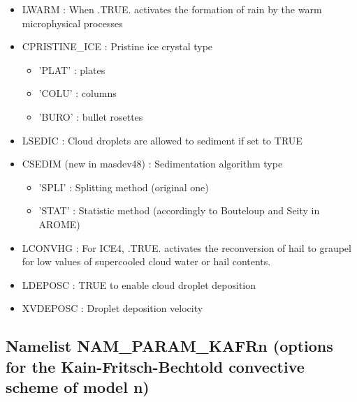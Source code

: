 \begin{itemize}
\item
LWARM : When .TRUE. activates the
formation of rain by the warm microphysical processes

\item
CPRISTINE\_ICE :
Pristine ice crystal type
\begin{itemize}
\item{'PLAT'} : plates 
\item{'COLU'} : columns
\item{'BURO'} : bullet rosettes
\end{itemize}

\item
LSEDIC :
Cloud droplets are allowed to sediment if set to TRUE
\item
CSEDIM (new in masdev48) :
Sedimentation algorithm type
\begin{itemize}
\item{'SPLI'} : Splitting method (original one)
\item{'STAT'} : Statistic method (accordingly to Bouteloup and Seity in AROME) 
\end{itemize}

\item
LCONVHG : For ICE4, .TRUE. activates the
reconversion of hail to graupel for low values of supercooled cloud water or hail contents.

\item
LDEPOSC : TRUE to enable cloud droplet deposition

\item
XVDEPOSC : Droplet deposition velocity

\end{itemize}
\subsection{Namelist NAM\_PARAM\_KAFRn (options for the Kain-Fritsch-Bechtold convective
scheme of model n)}



